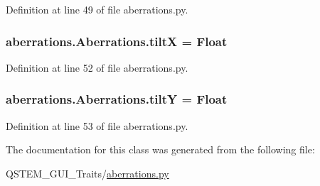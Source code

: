 Definition at line 49 of file aberrations.\-py.

\hypertarget{classaberrations_1_1_aberrations_a3f1b6bd8c0303bc4c01c49e401c4672d}{
\subsubsection[{tilt\-X}]{\setlength{\rightskip}{0pt plus 5cm}aberrations.\-Aberrations.\-tilt\-X = Float\hspace{0.3cm}{\ttfamily [static]}}}\label{classaberrations_1_1_aberrations_a3f1b6bd8c0303bc4c01c49e401c4672d}


Definition at line 52 of file aberrations.\-py.

\hypertarget{classaberrations_1_1_aberrations_ad6443a723b0a30fe7410f7732794c9a1}{
\subsubsection[{tilt\-Y}]{\setlength{\rightskip}{0pt plus 5cm}aberrations.\-Aberrations.\-tilt\-Y = Float\hspace{0.3cm}{\ttfamily [static]}}}\label{classaberrations_1_1_aberrations_ad6443a723b0a30fe7410f7732794c9a1}


Definition at line 53 of file aberrations.\-py.



The documentation for this class was generated from the following file\-:\begin{DoxyCompactItemize}
\item 
Q\-S\-T\-E\-M\-\_\-\-G\-U\-I\-\_\-\-Traits/\hyperlink{aberrations_8py}{aberrations.\-py}\end{DoxyCompactItemize}
